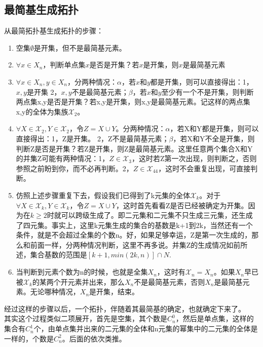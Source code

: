 \documentclass[a4paper,12pt]{article}
\begin{document}
\begin{CJK*}{UTF8}{gbsn}
	\section{最简基生成拓扑}
	从最简拓扑基生成拓扑的步骤：\\
	\begin{enumerate}
		\item 空集$\emptyset$是开集，但不是最简基元素。
		\item $\forall x \in X_n$，判断单点集${x}$是否是开集？若${x}$是开集，则${x}$是最简基元素
		\item $\forall x\in X_n,y\in X_n$，分两种情况：$\alpha$，若${x}$和${y}$都是开集，则可以直接得出：1，${x,y}$是开集 2，${x,y}$不是最简基元素；$\beta$，若${x}$和${y}$至少有一个不是开集，则判断两点集{x,y}是否是开集？若{x,y}是开集，则{x,y}是最简基元素。记这样的两点集{x,y}的全体为集族$\mathcal{X}_2$。
		\item $\forall X\in \mathcal{X}_2,Y\in \mathcal{X}_2$，令$Z=X\cup Y$。分两种情况：$\alpha$，若X和Y都是开集，则可以直接得出：1，Z是开集。 2，Z不是最简基元素；$\beta$，若X和Y不全是开集，则判断Z是否是开集？若Z是开集，则Z是最简基元素。这里任意两个集合X和Y的并集Z可能有两种情况：1，$Z \in \mathcal{X}_3$，这时若Z第一次出现，则判断之，否则参照之前盼到你，而不必再判断。2，$Z \in \mathcal{X}_44$，这时不会重复出现，可直接判断。
		\item 仿照上述步骤重复下去，假设我们已得到了k元集的全体$\mathcal{X}_k$。对于$\forall X \in \mathcal{X}_k,Y\in \mathcal{X}_k$，令$Z=X\cup Y$，这时首先看看Z是否已经被确定为开集。因为在$k \ge 2$时就可以跨级生成了。即二元集和二元集不只生成三元集，还生成了四元集。事实上，这里k元集生成的集合的基数是k+1到2k，当然还有一个条件，就是不会超过全集的个数n。好，如果足够幸运，Z是第一次生成的，那么和前面一样，分两种情况判断，这里不再多说。并集Z的生成情况如前所述，集合基数的范围是$[k+1,min(2k,n)]\cap N.$
		\item 当判断到元素个数为n的时候，也就是全集$X_n$，这时有$\mathcal{X}_n={X_n}$。如果$X_n$早已被$\mathcal{X}_k$的某两个开元素并出来，那么$X_n$不是最简基元素，否则$X_n$是最简基元素。无论哪种情况，$X_n$是开集，结束。
	\end{enumerate}
	经过这样的步骤以后，一个拓扑，伴随着其最简基的确定，也就确定下来了。\\
	其实这个过程类似二项展开，首先是空集，其个数是$C_n^0$，然后是单点集，这样的集合有$C_n^1$个，由单点集并出来的二元集的全体和n元集的幂集中的二元集的全体是一样的，个数是$C_n^2$。后面的依次类推。\\

\end{CJK*}
\end{document}
